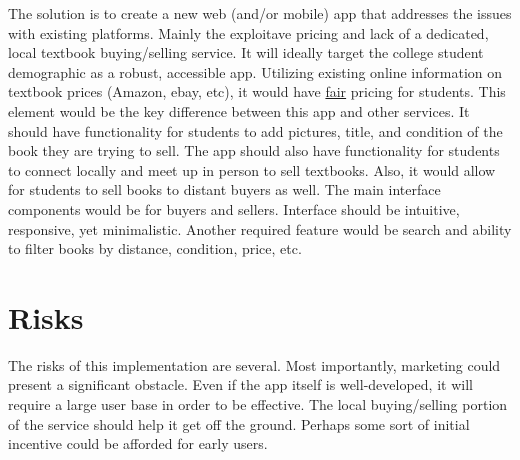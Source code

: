 \documentclass[12pt]{article}
\begin{document}
	The solution is to create a new web (and/or mobile) app that addresses the issues with existing platforms. Mainly the
	exploitave pricing and lack of a dedicated, local textbook buying/selling service.
	It will ideally target the college student demographic as a robust, accessible app. Utilizing existing online
        information on textbook prices (Amazon, ebay, etc), it would have \underline{fair} pricing for students. This element would be the
	key difference between this app and other services.
	It should have functionality for students to add pictures, title, and condition of the book they are trying to sell.
	The app should also have functionality for students to connect locally and meet up in person to sell textbooks.
        Also, it would allow for students to sell books to distant buyers as well.
	The main interface components would be for buyers and sellers. Interface should be intuitive, responsive,
        yet minimalistic. Another required feature would be search and ability to filter books by distance, condition, price, etc.


	\section{Risks}
	The risks of this implementation are several. Most importantly, marketing could present a significant obstacle.
        Even if the app itself is well-developed, it will require a large user base in order to be effective. The local
	buying/selling portion of the service should help it get off the ground.	
	Perhaps some sort of initial incentive could be afforded for early users. 
\end{document}
